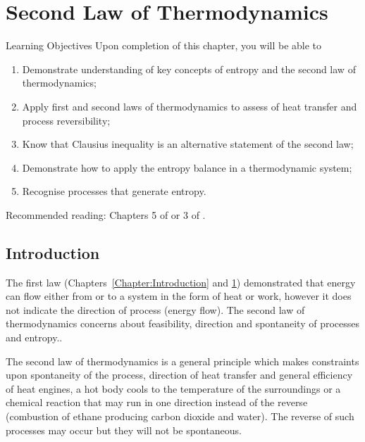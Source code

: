 
\chapter{Second Law of Thermodynamics}\label{Chapter:FirstLaw}

   \begin{LearningObjectivesBlock}{Learning Objectives}
      Upon completion of this chapter, you will be able to
        \begin{enumerate}
           \item Demonstrate understanding of key concepts of entropy and the second law of thermodynamics;
           \item Apply first and second laws of thermodynamics to assess of heat transfer and process reversibility;
           \item Know that Clausius inequality is an alternative statement of the second law;
           \item Demonstrate how to apply the entropy balance in a thermodynamic system;
           \item Recognise processes that generate entropy.
        \end{enumerate}
\medskip
     Recommended reading: Chapters 5 of \citet{SmithVanNess_Book,Moran_Book,Borgnakke_Book} or 3 of \citet{Atkins_Book}.
   \end{LearningObjectivesBlock}


  
   \section{Introduction}\label{Chapter:SecondLaw:Section:Intro}
   The first law (Chapters~\ref{Chapter:Introduction} and \ref{Chapter:FirstLaw}) demonstrated that energy can flow either from or to a system in the form of heat or work, however it does not indicate the direction of process (\ie energy flow). The second law of thermodynamics concerns about feasibility, direction and spontaneity of processes and entropy..
   
The second law of thermodynamics is a general principle which makes constraints upon spontaneity of the process, direction of heat transfer and general efficiency of heat engines, \eg a hot body cools to the temperature of the surroundings or a chemical reaction that may run in one direction instead of the reverse (\eg combustion of ethane producing carbon dioxide and water). The reverse of such processes may occur but they will not be spontaneous.  
  
